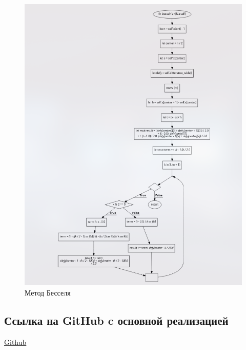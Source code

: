 \documentclass{article}
\begin{document}
                \begin{figure}[H]
                      \centering
                      \includegraphics[width=360pt]{alg5.png}
                      \caption[Схема-1]{Метод Бесселя}
                      \label{fig:screenshot005}
                \end{figure}             
            \subsection{Ссылка на GitHub c основной реализацией}
                  \href{https://github.com/isofinly/compmath}{Github}
      
\end{document}
